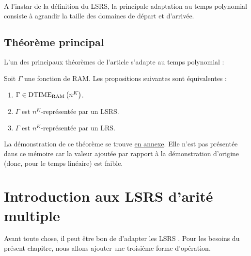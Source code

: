 		A l'instar de la définition du LSRS, la principale adaptation au temps polynomial consiste à agrandir la taille des domaines de départ et d'arrivée.
		
		\subsection{Théorème principal}
		\label{sec:theorem_principal_grandjean_schwentick}
		
		L'un des principaux théorèmes de l'article \cite{GrandjeanSchwentick2002} s'adapte au temps polynomial :
		
		\begin{conj}
			\label{conj:main_big_theorem}
			Soit $\Gamma$ une fonction de RAM. Les propositions suivantes sont équivalentes :
			
			\begin{enumerate}[itemsep=-1mm]
				\item 	\label{num:main_gamma_in_nk}
				$\Gamma \in \text{DTIME}_{\text{RAM}}\left( n^{K} \right)$.
				
				\item 	\label{num:main_gamma_nk_rep_LSRS}
				$\Gamma$ est $n^K$-représentée par un LSRS.
				
				\item	\label{num:main_gamma_nk_rep_LRS}
				$\Gamma$ est $n^K$-représentée par un LRS.
			\end{enumerate}
		\end{conj}
		
		La démonstration de ce théorème se trouve \hyperref[sec:LRS_et_temps_poly]{en annexe}. Elle n'est pas présentée dans ce mémoire car la valeur ajoutée par rapport à la démonstration d'origine (donc, pour le temps linéaire) est faible. 
		
		
	
	
	\section{Introduction aux LSRS d'arité multiple}
	\label{sec:rintroduction}
	
		Avant toute chose, il peut être bon de d'adapter les LSRS \cite{Schwentick1997} \cite{GrandjeanSchwentick2002}. Pour les besoins du présent chapitre, nous allons ajouter une troisième forme d'opération.
		
